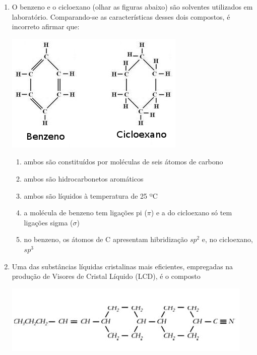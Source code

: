 \documentclass[10pt,a4paper]{article}
\newenvironment{Figure}
  {\par\medskip\noindent\minipage{\linewidth}}
  {\endminipage\par\medskip}
\begin{document}
\begin{multicols}{2}
\begin{enumerate}
	\item O benzeno e o cicloexano (olhar as figuras abaixo) s\~ao solventes utilizados em laborat\'orio. Comparando-se as caracter\'isticas desses dois compostos, \'e incorreto afirmar que:

\begin{Figure}
     \centering
     \includegraphics[width=\linewidth]{benzeno_cicloexano_quimica.jpg}
\end{Figure}

		\begin{enumerate}
		\item ambos s\~ao constitu\'idos por mol\'eculas de seis \'atomos de carbono
		\item  ambos s\~ao hidrocarbonetos arom\'aticos
		\item ambos s\~ao l\'iquidos \`a temperatura de 25 ºC
		\item a mol\'ecula de benzeno tem liga\c{c}\~oes pi ($\pi$) e a do cicloexano s\'o tem liga\c{c}\~oes sigma ($\sigma$)
		\item no benzeno, os \'atomos de C apresentam hibridiza\c{c}\~ao $sp^2$ e, no cicloexano, $sp^3$
		\end{enumerate}

	\item Uma das subst\^ancias l\'iquidas cristalinas mais eficientes, empregadas na produ\c{c}\~ao de Visores de Cristal L\'iquido (LCD), \'e o composto 

\begin{Figure}
     \centering
     \includegraphics[width=\linewidth]{composto_quimica.jpg}
\end{Figure}


\end{enumerate}
\end{multicols}
\end{document}
